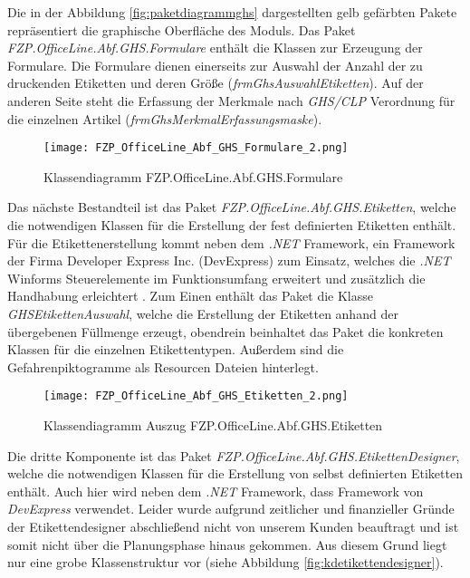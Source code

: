 \noindent
Die in der Abbildung \ref{fig:paketdiagrammghs} dargestellten gelb 
gefärbten Pakete repräsentiert die graphische Oberfläche des Moduls. Das Paket 
\emph{FZP.OfficeLine.Abf.GHS.Formulare} enthält die Klassen zur Erzeugung der Formulare. Die 
Formulare dienen einerseits zur Auswahl der Anzahl der zu druckenden Etiketten und deren 
Größe (\emph{frmGhsAuswahlEtiketten}). Auf der anderen Seite steht die Erfassung der Merkmale 
nach \emph{GHS/CLP} Verordnung für die einzelnen Artikel (\emph{frmGhsMerkmalErfassungsmaske}). 

\begin{figure}[H]
    \centering
    \texttt{[image: FZP\_OfficeLine\_Abf\_GHS\_Formulare\_2.png]}
    \caption[Klassendiagramm FZP.OfficeLine.Abf.GHS.Formulare]
    {\small{Klassendiagramm FZP.OfficeLine.Abf.GHS.Formulare}}
    \label{fig:kdformulare}
\end{figure}

\noindent
Das nächste Bestandteil ist das Paket \emph{FZP.OfficeLine.Abf.GHS.Etiketten}, welche die
notwendigen Klassen für die Erstellung der fest definierten Etiketten enthält. Für die
Etikettenerstellung kommt neben dem \emph{.NET} Framework, ein Framework der Firma 
Developer Express Inc. (DevExpress) zum Einsatz, welches die \emph{.NET} Winforms Steuerelemente 
im Funktionsumfang erweitert und zusätzlich die Handhabung erleichtert \cite{devexpress}. Zum Einen
enthält das Paket die Klasse \emph{GHSEtikettenAuswahl}, welche die Erstellung der Etiketten
anhand der übergebenen Füllmenge erzeugt, obendrein beinhaltet das Paket die konkreten Klassen 
für die einzelnen Etikettentypen. Außerdem sind die Gefahrenpiktogramme als Resourcen Dateien hinterlegt. 

\begin{figure}[H]
    \centering
    \texttt{[image: FZP\_OfficeLine\_Abf\_GHS\_Etiketten\_2.png]}
    \caption[Klassendiagramm Auszug FZP.OfficeLine.Abf.GHS.Etiketten]
    {\small{Klassendiagramm Auszug FZP.OfficeLine.Abf.GHS.Etiketten}}
    \label{fig:kdetiketten}
\end{figure}

\noindent
Die dritte Komponente ist das Paket \emph{FZP.OfficeLine.Abf.GHS.EtikettenDesigner}, 
welche die notwendigen Klassen für die Erstellung von selbst definierten Etiketten 
enthält. Auch hier wird neben dem \emph{.NET} Framework, dass Framework von \emph{DevExpress} 
verwendet. Leider wurde aufgrund zeitlicher und finanzieller Gründe der Etikettendesigner 
abschließend nicht von unserem Kunden beauftragt und ist somit nicht über die Planungsphase 
hinaus gekommen. Aus diesem Grund liegt nur eine grobe Klassenstruktur vor (siehe Abbildung 
\ref{fig:kdetikettendesigner}). 

